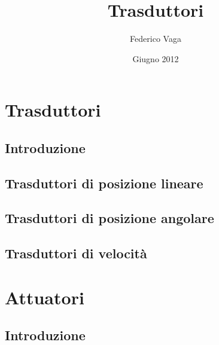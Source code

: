 \documentclass[a4paper,10pt]{book}
\title{Trasduttori}
\author{Federico Vaga}
\date{Giugno 2012}
\begin{document}


\tableofcontents
\listoffigures

\part{Trasduttori}
\chapter{Introduzione}

\chapter{Trasduttori di posizione lineare}

\chapter{Trasduttori di posizione angolare}

\chapter{Trasduttori di velocità}


\part{Attuatori}
\chapter{Introduzione}

\end{document}
